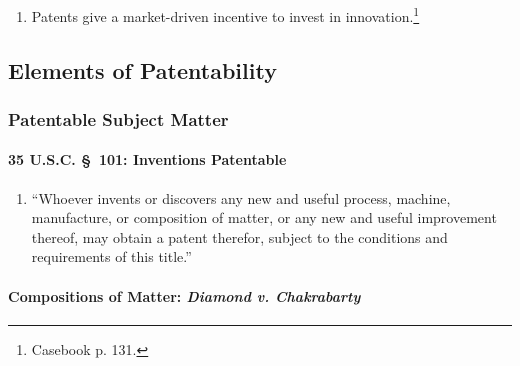 \begin{enumerate}
    \item Patents give a market-driven incentive to invest in 
    innovation.\footnote{Casebook p. 131.}
\end{enumerate}

\subsection{Elements of Patentability}

\subsubsection{Patentable Subject Matter}

\paragraph{35 U.S.C. \S\ 101: Inventions Patentable}

\begin{enumerate}
    \item ``Whoever invents or discovers any new and useful process, machine, 
    manufacture, or composition of matter, or any new and useful improvement 
    thereof, may obtain a patent therefor, subject to the conditions and 
    requirements of this title.''
\end{enumerate}

\paragraph{Compositions of Matter: \emph{Diamond v. Chakrabarty}}

